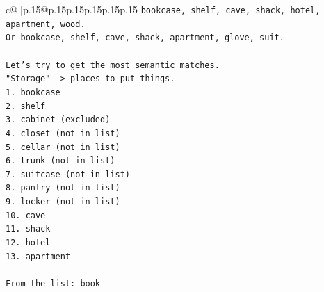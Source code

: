 \documentclass{article}
\begin{document}
{\begin{supertabular}{c@{$\;$}|p{.15\linewidth}@{}p{.15\linewidth}p{.15\linewidth}p{.15\linewidth}p{.15\linewidth}p{.15\linewidth}}
{{{\texttt{bookcase, shelf, cave, shack, hotel, apartment, wood.} \\
\texttt{Or bookcase, shelf, cave, shack, apartment, glove, suit.} \\
\\ 
\texttt{Let's try to get the most semantic matches.} \\
\texttt{"Storage" {-}> places to put things.} \\
\texttt{1. bookcase} \\
\texttt{2. shelf} \\
\texttt{3. cabinet (excluded)} \\
\texttt{4. closet (not in list)} \\
\texttt{5. cellar (not in list)} \\
\texttt{6. trunk (not in list)} \\
\texttt{7. suitcase (not in list)} \\
\texttt{8. pantry (not in list)} \\
\texttt{9. locker (not in list)} \\
\texttt{10. cave} \\
\texttt{11. shack} \\
\texttt{12. hotel} \\
\texttt{13. apartment} \\
\\ 
\texttt{From the list: book} \\
            }
        }
    }
     \\ \\


\end{supertabular}}
\end{document}
